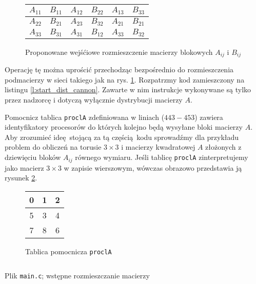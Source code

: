 \begin{figure}[H]
\centering
\begin{tabular}{|cc|cc|cc|}
\hline
\(A_{11}\) & \(B_{11}\) & \(A_{12}\) & \(B_{22}\) & \(A_{13}\) & \(B_{33}\) \\
\hline
\(A_{22}\) & \(B_{21}\) & \(A_{23}\) & \(B_{32}\) & \(A_{21}\) & \(B_{21}\) \\
\hline
\(A_{33}\) & \(B_{31}\) & \(A_{31}\) & \(B_{12}\) & \(A_{33}\) & \(B_{32}\) \\
\hline
\end{tabular}
\caption{Proponowane wejśćiowe rozmieszczenie macierzy blokowych \(A_{ij}\) i \(B_{ij}\)} 
\label{fig:cannon_src2}
\end{figure}

Operację tę można uprościć przechodząc bezpośrednio do rozmieszczenia podmacierzy w sieci takiego jak na rys. \ref{fig:cannon_src2}. Rozpatrzmy kod zamieszczony na listingu \ref{l:start_dist_cannon}. Zawarte w nim instrukcje wykonywane są tylko przez nadzorcę i dotyczą wyłącznie dystrybucji macierzy \(A\).


Pomocnicz tablica \texttt{proclA} zdefiniowana w liniach (\(443-453\)) zawiera identyfikatory procesorów do których kolejno będą wysyłane bloki macierzy \(A\). Aby zrozumieć ideę stojącą za tą częścią kodu sprowadźmy dla przykładu problem do obliczeń na torusie \(3\times 3\) i macierzy kwadratowej \(A\) złożonych z dziewięciu bloków \(A_{ij}\) równego wymiaru. Jeśli tablicę \texttt{proclA} zinterpretujemy jako macierz \(3\times 3\) w zapisie wierszowym, wówczas obrazowo przedstawia ją rysunek \ref{fig:proclA}.

\begin{figure}[H]
\centering
\begin{tabular}{|c|c|c|}
\hline
0 & 1 & 2 \\
\hline
5 & 3 & 4 \\
\hline
7 & 8 & 6 \\
\hline
\end{tabular}
\caption{Tablica pomocnicza \texttt{proclA}}
\label{fig:proclA}
\end{figure}

\begin{listing}[H]
\inputminted[fontsize=\footnotesize,bgcolor=bg,linenos,firstnumber=443,firstline=443,lastline=485]{c}{includes/listings/main.c}
\caption{Plik \texttt{main.c}; wstępne rozmieszczanie macierzy}
\label{l:start_dist_cannon}
\end{listing}

